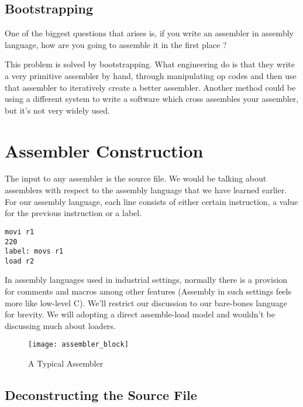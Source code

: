 \section{Bootstrapping}

One of the biggest questions that arises is, if you write an assembler in assembly language, how are you going to assemble it in the first place ?

This problem is solved by bootstrapping. What engineering do is that they write a very primitive assembler by hand, through manipulating op codes and then use that assembler to iteratively create a better assembler. Another method could be using a different system to write a software which cross assembles your assembler, but it's not very widely used.



\chapter{Assembler Construction}

The input to any assembler is the source file. We would be talking about assemblers with respect to the assembly language that we have learned earlier. For our assembly language, each line consists of either certain instruction, a value for the previous instruction or a label.

\begin{lstlisting}[caption = Assembly Code Snippet]
movi r1
220
label: movs r1
load r2
\end{lstlisting}

In assembly languages used in industrial settings, normally there is a provision for comments and macros among other features (Assembly in such settings feels more like low-level C). We'll restrict our discussion to our bare-bones language for brevity. We will adopting a direct assemble-load model 
and wouldn't be discussing much about loaders.

\begin{figure}
\caption{A Typical Assembler}
\label{fig:assmblr}
\centering
\texttt{[image: assembler\_block]}
\end{figure}

\section{Deconstructing the Source File}

